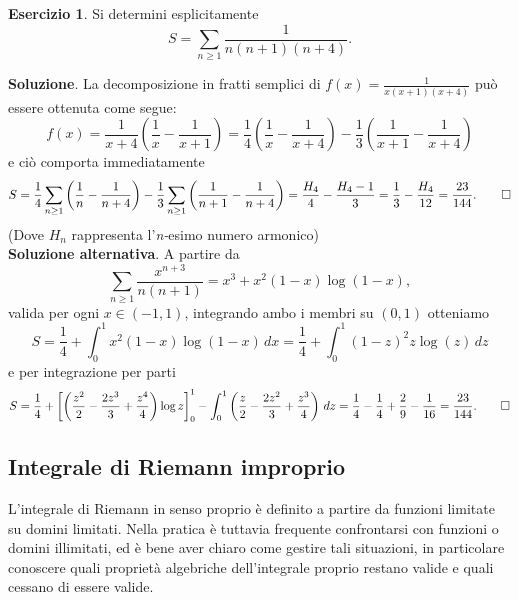 \documentclass[a4paper,twoside]{article}
\theoremstyle{definition}
\newtheorem{ex}[theorem]{Esercizio}
\numberwithin{theorem}{section}
\begin{document}
\begin{ex} Si determini esplicitamente 
$$ S=\sum_{n\geq 1}\frac{1}{n(n+1)(n+4)}.$$
\end{ex}
\textbf{Soluzione}. La decomposizione in fratti semplici di $f(x)=\frac{1}{x(x+1)(x+4)}$ può essere ottenuta come segue:
$$ f(x)=\frac{1}{x+4}\left(\frac{1}{x}-\frac{1}{x+1}\right) = \frac{1}{4}\left(\frac{1}{x}-\frac{1}{x+4}\right)-\frac{1}{3}\left(\frac{1}{x+1}-\frac{1}{x+4}\right) $$
e ciò comporta immediatamente 
$$ S = \frac{1}{4}\sum_{n\geq 1}\left(\frac{1}{n}-\frac{1}{n+4}\right)-\frac{1}{3}\sum_{n\geq 1}\left(\frac{1}{n+1}-\frac{1}{n+4}\right) = \frac{H_4}{4}-\frac{H_4-1}{3} = \frac{1}{3}-\frac{H_4}{12} = \frac{23}{144}.\qed$$
(Dove $H_n$ rappresenta l'\emph{n-}esimo numero armonico)\\

\textbf{Soluzione alternativa}. A partire da 
$$ \sum_{n\geq 1}\frac{x^{n+3}}{n(n+1)} = x^3+x^2(1-x)\log(1-x), $$
valida per ogni $x\in(-1,1)$, integrando ambo i membri su $(0,1)$ otteniamo 
$$ S = \frac{1}{4}+\int_{0}^{1}x^2(1-x)\log(1-x)\,dx = \frac{1}{4}+\int_{0}^{1}(1-z)^2 z \log(z)\,dz  $$
e per integrazione per parti 
$$ S = \frac{1}{4}+\left[\left(\frac{z^2}{2}-\frac{2z^3}{3}+\frac{z^4}{4}\right)\log z\right]_{0}^{1}-\int_{0}^{1}\left(\frac{z}{2}-\frac{2z^2}{3}+\frac{z^3}{4}\right)\,dz=\frac{1}{4}-\frac{1}{4}+\frac{2}{9}-\frac{1}{16} = \frac{23}{144}.\qed$$

\subsection{Integrale di Riemann improprio}
L'integrale di Riemann in senso proprio è definito a partire da funzioni limitate su domini limitati. Nella pratica è tuttavia frequente confrontarsi con funzioni o domini illimitati, ed è bene aver chiaro come gestire tali situazioni, in particolare conoscere quali proprietà algebriche dell'integrale proprio restano valide e quali cessano di essere valide.\\
\end{document}
